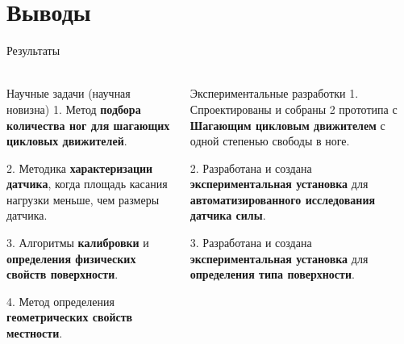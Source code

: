 \section{Выводы}

\begin{frame}[t]{Результаты}
    \framesubtitle{}
    \begin{columns}[T,onlytextwidth]
        \begin{column}{0.48\textwidth}
            \begin{block}{Научные задачи (научная новизна)}
                1. Метод \textbf{подбора количества ног для шагающих цикловых движителей}.

                2. Методика \textbf{характеризации датчика}, когда площадь касания нагрузки меньше, чем размеры датчика.

                3. Алгоритмы \textbf{калибровки} и \textbf{определения физических свойств поверхности}.

                4. Метод определения \textbf{геометрических свойств местности}.

            \end{block}
        \end{column}
        \begin{column}{0.48\textwidth}
            \begin{alertblock}{Экспериментальные разработки}
                1. Спроектированы и собраны 2 прототипа с \textbf{Шагающим цикловым движителем} с одной степенью свободы в ноге.

                2. Разработана и создана \textbf{экспериментальная установка} для \textbf{автоматизированного исследования датчика силы}.

                3. Разработана и создана \textbf{экспериментальная установка} для \textbf{определения типа поверхности}.

            \end{alertblock}
        \end{column}
    \end{columns}
\end{frame}


